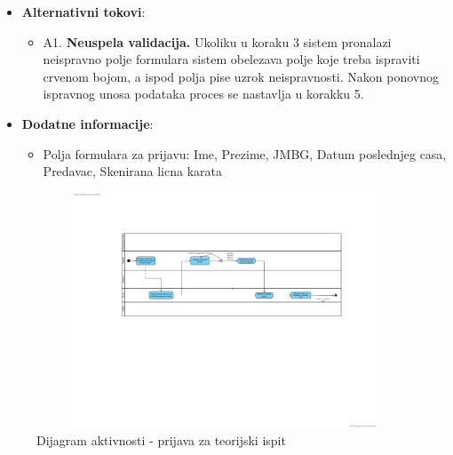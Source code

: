 \begin{itemize}
  \item \textbf{Alternativni tokovi}:
      \begin{itemize}
        \item A1. \textbf{Neuspela validacija.}
        Ukoliku u koraku 3 sistem pronalazi neispravno polje formulara sistem obelezava polje koje treba ispraviti crvenom bojom, a ispod polja pise  uzrok neispravnosti. Nakon ponovnog ispravnog unosa podataka proces se nastavlja u korakku 5.
      \end{itemize}
      
  \item \textbf{Dodatne informacije}:
      \begin{itemize}
        \item Polja formulara za prijavu: Ime, Prezime, JMBG, Datum poslednjeg casa, Predavac, Skenirana licna karata 
      \end{itemize}
\end{itemize}

\begin{figure}[H]
  \begin{center}
      \includegraphics[width=140mm, height=70mm]{Diagrams/prijava za polaganje teorijskog ispita.png}
  \end{center}
  \caption {Dijagram aktivnosti - prijava za teorijski ispit}
  \label{activity_prijava_za_teoriju}

\end{figure}
